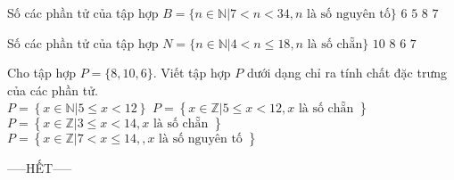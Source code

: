 \documentclass[12pt,a4paper]{article}
\begin{document}
\begin{ex}
 Số các phần tử của tập hợp $B=\{n\in \mathbb{N}| 7< n <34, n \text{ là số nguyên tố} \}$ 
\choice
{ ${6}$ }
   { ${5}$ }
     { ${8}$ }
    { \True ${7}$ }
\end{ex}

\begin{ex}
 Số các phần tử của tập hợp $N=\{n\in \mathbb{N}| 4< n \le 18, n \text{ là số chẵn} \}$ 
\choice
{ ${10}$ }
   { ${8}$ }
     { ${6}$ }
    { \True ${7}$ }
\end{ex}

\begin{ex}
 Cho tập hợp $P=\{{8, 10, 6}\}$. Viết tập hợp ${P}$ dưới dạng chỉ ra tính chất đặc trưng của các phần tử.\\ 
\choice
{ $P=\left\{x\in \mathbb{N}|5 \le x < 12 \right\}$ }
   { \True $P=\left\{x\in \mathbb{Z}|5 \le x < 12, x \text{ là số chẵn } \right\}$ }
     { $P=\left\{x\in \mathbb{Z}|3 \le x < 14, x \text{ là số chẵn } \right\}$ }
    { $P=\left\{x\in \mathbb{Z}|7 < x \le 14,, x \text{ là số nguyên tố } \right\}$ }
\end{ex}


 \begin{center}
-----HẾT-----
\end{center}

\end{document}
